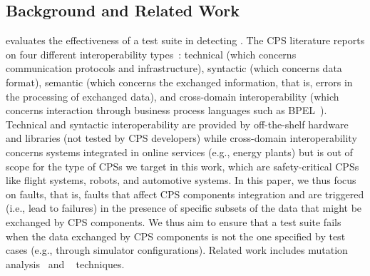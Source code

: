 
\subsection{Background and Related Work}

 evaluates the effectiveness of a test suite in detecting . The CPS literature reports on four different interoperability types~\cite{Givehchi:2017}: technical (which concerns communication protocols and  infrastructure), syntactic (which concerns data format), semantic (which concerns the exchanged information, that is, errors in the processing of exchanged data), and cross-domain interoperability (which concerns interaction through business process languages such as BPEL~\cite{BPEL}).
Technical and syntactic interoperability are provided by off-the-shelf hardware and libraries
(not tested by CPS developers)
 while cross-domain interoperability concerns systems integrated in online services (e.g., energy plants) but is out of scope for the type of CPSs we target in this work, which are safety-critical CPSs like flight systems, robots, and automotive systems. In this paper, we thus focus on  faults,
 that is, faults that affect CPS components integration and are triggered (i.e., lead to failures) in the presence of specific subsets of the data that might be exchanged by CPS components. We thus aim to ensure that a test suite fails when the data exchanged by CPS components is not the one specified by test cases (e.g., through simulator configurations).
Related work includes mutation analysis~\cite{jia2010analysis,papadakis2019mutation} and ~\cite{natella2016assessing} techniques.



